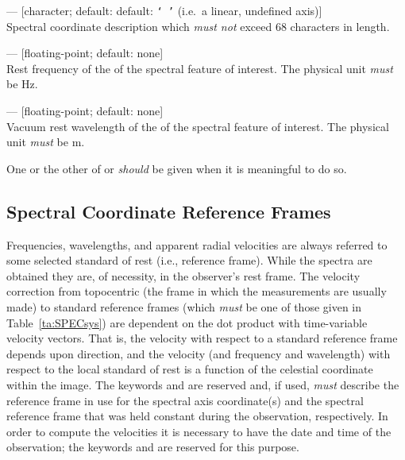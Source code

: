 \documentclass[11pt,makeidx]{book}     %
\begin{document}
\begin{description}

\item {}  --- [character; default: default: \texttt{`\ '}
(i.e.\ a linear, undefined axis)]\\ 
Spectral coordinate description which
{\em must not} exceed 68 characters in length. 

\item {}  --- [floating-point; default: none]\\ 
Rest frequency of
the of the spectral feature of interest. The physical unit {\em must} be Hz.

\item {}  --- [floating-point; default: none]\\ 
Vacuum rest
wavelength of the of the spectral feature of interest. The physical unit
{\em must} be m.

\end{description}

\noindent One or the other of  or  {\em should}
be given when it is meaningful to do so. 

\subsection{Spectral Coordinate Reference Frames}

Frequencies, wavelengths, and apparent radial velocities are always referred to
some selected standard of rest (i.e., reference frame). While the spectra are
obtained they are, of necessity, in the observer's rest frame. The velocity
correction from topocentric (the frame in which the measurements are usually made)
to standard reference frames (which {\em must} be one of those given in
Table~\ref{ta:SPECsys}) are dependent on the dot product with time-variable velocity vectors.
That is, the velocity with respect to a standard reference frame depends upon
direction, and the velocity (and frequency and wavelength) with respect to the
local standard of rest is a function of the celestial coordinate within the image.
The keywords  and  are reserved and, if used,
{\em must} describe the reference frame in use for the spectral axis
coordinate(s) and the spectral reference frame that was held constant during the
observation, respectively. In order to compute the velocities it is necessary to
have the date and time of the observation; the keywords   and
 are reserved for this purpose. 
\end{document}
